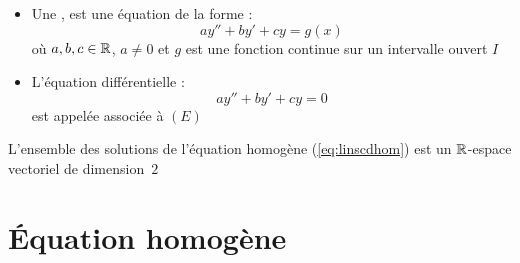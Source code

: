\begin{frame}
\begin{itemize}
  \item Une , est une équation de la forme :
\begin{equation}
ay''+by'+cy=g(x) 
\label{eq:linscd}
\tag{$E$}
\end{equation}
où $a,b,c \in \mathbb{R}$, $a \neq 0$ et $g$ est une fonction continue sur
un intervalle ouvert $I$  

\pause

  \item L'équation différentielle : 
\begin{equation}
ay''+by'+cy=0 
\label{eq:linscdhom}
\tag{$E_0$}
\end{equation}
est appelée  associée à $(E)$
  
\end{itemize}


\pause

\begin{theoreme}
L'ensemble des solutions de l'équation homogène 
(\ref{eq:linscdhom}) est un $\mathbb{R}$-espace vectoriel de dimension~$2$
\end{theoreme}

\end{frame}



\section*{\'Equation homogène}

